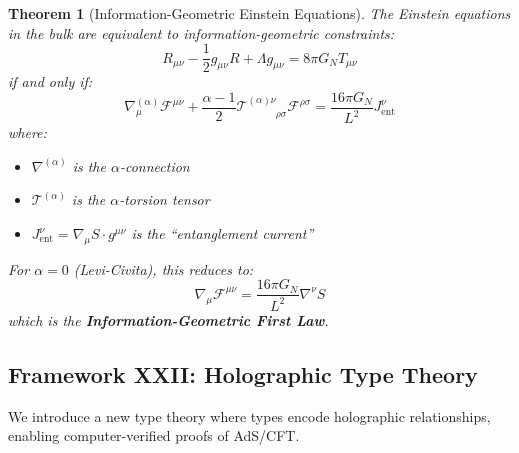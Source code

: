 \documentclass[12pt,a4paper]{article}
\newtheorem{theorem}{Theorem}[section]
\begin{document}
\begin{theorem}[Information-Geometric Einstein Equations]\label{thm:info-einstein}
The Einstein equations in the bulk are equivalent to information-geometric constraints:
\begin{equation}
R_{\mu\nu} - \frac{1}{2}g_{\mu\nu}R + \Lambda g_{\mu\nu} = 8\pi G_N T_{\mu\nu}
\end{equation}
if and only if:
\begin{equation}
\nabla^{(\alpha)}_\mu \mathcal{F}^{\mu\nu} + \frac{\alpha-1}{2} \mathcal{T}^{(\alpha)\nu}_{\phantom{(\alpha)\nu}\rho\sigma} \mathcal{F}^{\rho\sigma} = \frac{16\pi G_N}{L^2} J^\nu_{\text{ent}}
\end{equation}
where:
\begin{itemize}
    \item $\nabla^{(\alpha)}$ is the $\alpha$-connection
    \item $\mathcal{T}^{(\alpha)}$ is the $\alpha$-torsion tensor
    \item $J^\nu_{\text{ent}} = \nabla_\mu S \cdot g^{\mu\nu}$ is the ``entanglement current''
\end{itemize}

For $\alpha = 0$ (Levi-Civita), this reduces to:
\begin{equation}
\nabla_\mu \mathcal{F}^{\mu\nu} = \frac{16\pi G_N}{L^2} \nabla^\nu S
\end{equation}
which is the \textbf{Information-Geometric First Law}.
\end{theorem}

\subsection{Framework XXII: Holographic Type Theory}

We introduce a new type theory where types encode holographic relationships, enabling computer-verified proofs of AdS/CFT.
\end{document}
